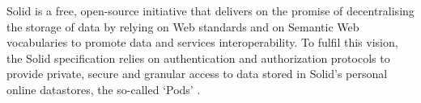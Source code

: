 Solid is a free, open-source initiative that delivers on the promise of decentralising the storage of data by relying on Web standards and on Semantic Web vocabularies to promote data and services interoperability. To fulfil this vision, the Solid specification relies on authentication and authorization protocols to provide private, secure and granular access to data stored in Solid's personal online datastores, the so-called `Pods' \citep{mansour_demonstration_2016}.